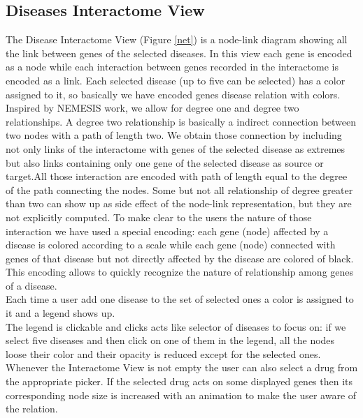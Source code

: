 \documentclass[12pt,twocolumn,twoside]{article}
\begin{document}
\subsection*{Diseases Interactome View}
The Disease Interactome View (Figure \ref{net}) is a node-link diagram showing all the link between genes of the selected diseases. In this view each gene is encoded as a node while each interaction between genes recorded in the interactome is encoded as a link. Each selected disease (up to five can be selected) has a color assigned to it, so basically we have encoded genes disease relation with colors.\\
Inspired by NEMESIS\cite{ivapp19} work, we allow for degree one and degree two relationships. A degree two relationship is basically a indirect connection between two nodes with a path of length two. We obtain those connection by including not only links of the interactome with genes of the selected disease as extremes but also links containing only one gene of the selected disease as source or target.\newline All those interaction are encoded with path of length equal to the degree of the path connecting the nodes. Some but not all relationship of degree greater than two can show up as side effect of the node-link representation, but they are not explicitly computed. To make clear to the users the nature of those interaction we have used a special encoding: each gene (node) affected by a disease is colored according to a scale while each gene (node) connected with genes of that disease but not directly affected by the disease are colored of black.  This encoding allows to quickly recognize the nature of relationship among genes of a disease.\\ 
Each time a user add one disease to the set of selected ones a color is assigned to it and a legend shows up.\\ The legend is clickable and clicks acts like selector of diseases to focus on: if we select five diseases and then click on one of them in the legend, all the nodes loose their color and their opacity is reduced except for the selected ones. \\
Whenever the Interactome View is not empty the user can also select a drug from the appropriate picker. If the selected drug acts on some displayed genes then its corresponding node size is increased with an animation to make the user aware of the relation.\\
\end{document}
